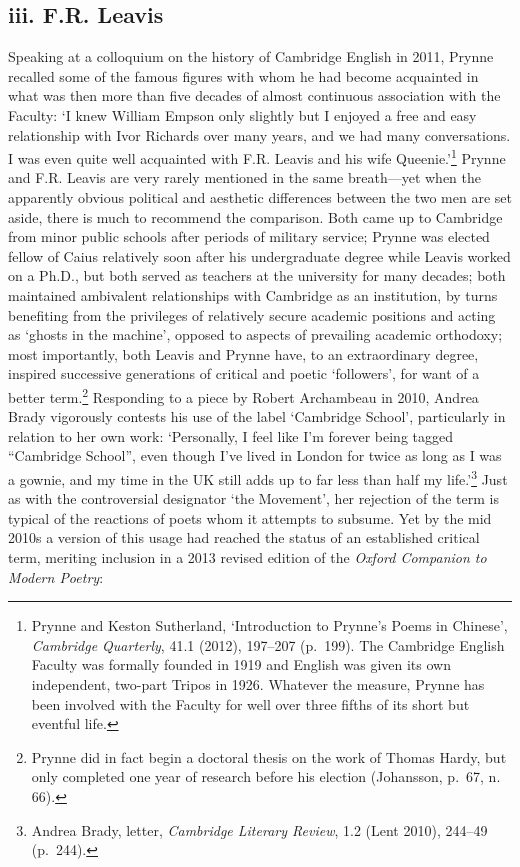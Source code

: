 \documentclass[]{article}
\begin{document}
\subsection{iii. F.R. Leavis}\label{iii.-f.r.-leavis}

Speaking at a colloquium on the history of Cambridge English in 2011,
Prynne recalled some of the famous figures with whom he had become
acquainted in what was then more than five decades of almost continuous
association with the Faculty: `I knew William Empson only slightly but I
enjoyed a free and easy relationship with Ivor Richards over many years,
and we had many conversations. I was even quite well acquainted with
F.R. Leavis and his wife Queenie.'\footnote{Prynne and Keston
  Sutherland, `Introduction to Prynne's Poems in Chinese',
  \emph{Cambridge Quarterly}, 41.1 (2012), 197--207 (p.~199). The
  Cambridge English Faculty was formally founded in 1919 and English was
  given its own independent, two-part Tripos in 1926. Whatever the
  measure, Prynne has been involved with the Faculty for well over three
  fifths of its short but eventful life.} Prynne and F.R. Leavis are
very rarely mentioned in the same breath---yet when the apparently
obvious political and aesthetic differences between the two men are set
aside, there is much to recommend the comparison. Both came up to
Cambridge from minor public schools after periods of military service;
Prynne was elected fellow of Caius relatively soon after his
undergraduate degree while Leavis worked on a Ph.D., but both served as
teachers at the university for many decades; both maintained ambivalent
relationships with Cambridge as an institution, by turns benefiting from
the privileges of relatively secure academic positions and acting as
`ghosts in the machine', opposed to aspects of prevailing academic
orthodoxy; most importantly, both Leavis and Prynne have, to an
extraordinary degree, inspired successive generations of critical and
poetic `followers', for want of a better term.\footnote{Prynne did in
  fact begin a doctoral thesis on the work of Thomas Hardy, but only
  completed one year of research before his election (Johansson, p.~67,
  n. 66).} Responding to a piece by Robert Archambeau in 2010, Andrea
Brady vigorously contests his use of the label `Cambridge School',
particularly in relation to her own work: `Personally, I feel like I'm
forever being tagged ``Cambridge School'', even though I've lived in
London for twice as long as I was a gownie, and my time in the UK still
adds up to far less than half my life.'\footnote{Andrea Brady, letter,
  \emph{Cambridge Literary Review}, 1.2 (Lent 2010), 244--49 (p.~244).}
Just as with the controversial designator `the Movement', her rejection
of the term is typical of the reactions of poets whom it attempts to
subsume. Yet by the mid 2010s a version of this usage had reached the
status of an established critical term, meriting inclusion in a 2013
revised edition of the \emph{Oxford Companion to Modern Poetry}:
\end{document}
